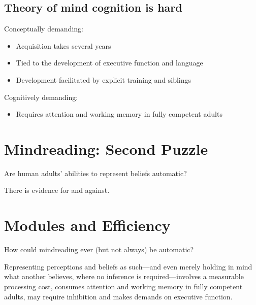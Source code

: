 \documentclass[12pt]{extarticle}
\begin{document}
\begin{multicols}{3}
\subsection{Theory of mind cognition is hard}
 
Conceptually demanding:
 
\begin{itemize}\itemsep0pt
 
\item Acquisition takes several years\citep{Wimmer:1983dz,Wellman:2001lz}
 
\item Tied to the development of executive function\citep{Perner:1999yr,Sabbagh:2006ke} and language\citep{Astington2005ot}
 
\item Development facilitated by explicit training\citep{Slaughter:1996fv} and siblings\citep{Clements:2000nc,Hughes:2004zj}
 
\end{itemize}
 
Cognitively demanding:
 
\begin{itemize}
 
\item Requires attention and working memory in fully competent adults\citep{Apperly:2008jv,McKinnon:2007rr}
 
\end{itemize}
 
 
 
\section{Mindreading: Second Puzzle}
 
Are human adults’ abilities to represent beliefs automatic?
 
There is evidence for\citep{kovacs_social_2010,Schneider:2011fk} and against.\citep{apperly:2008_back,apperly_why_2010}
 
 
 
\section{Modules and Efficiency}
 
How could mindreading ever (but not always) be automatic?
 
Representing perceptions and beliefs as such---and even merely holding in mind what another believes, where no inference is required---involves a measurable processing cost\citep{apperly:2008_back,apperly:2010_limits}, consumes attention and working memory in fully competent adults,\citealp{Apperly:2009cc, lin:2010_reflexively, McKinnon:2007rr} may require inhibition\citep{bull:2008_role} and makes demands on executive function.\citep{apperly:2004_frontal,samson:2005_seeing}
 

\end{multicols}
\end{document}
